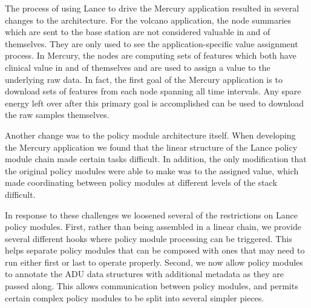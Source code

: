 The process of using Lance to drive the Mercury application resulted in
several changes to the architecture. For the volcano application, the node
summaries which are sent to the base station are not considered valuable in
and of themselves. They are only used to see the application-specific value
assignment process. In Mercury, the nodes are computing sets of features
which both have clinical value in and of themselves and are used to assign a
value to the underlying raw data. In fact, the first goal of the Mercury
application is to download sets of features from each node spanning all time
intervals. Any spare energy left over after this primary goal is accomplished
can be used to download the raw samples themselves.

Another change was to the policy module architecture itself. When developing
the Mercury application we found that the linear structure of the Lance
policy module chain made certain tasks difficult. In addition, the only
modification that the original policy modules were able to make was to the
assigned value, which made coordinating between policy modules at different
levels of the stack difficult.

In response to these challenges we loosened several of the restrictions on
Lance policy modules. First, rather than being assembled in a linear chain,
we provide several different hooks where policy module processing can be
triggered. This helps separate policy modules that can be composed with ones
that may need to run either first or last to operate properly. Second, we now
allow policy modules to annotate the ADU data structures with additional
metadata as they are passed along. This allows communication between policy
modules, and permits certain complex policy modules to be split into several
simpler pieces.
